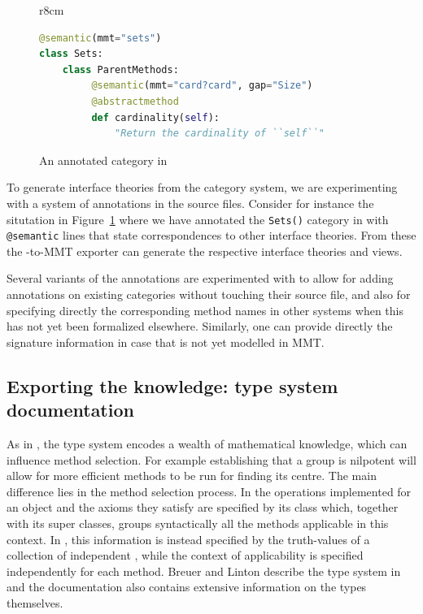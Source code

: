 \begin{figure}r{8cm}\vspace*{-2.5em}
\begin{lstlisting}[language=Python]
@semantic(mmt="sets")
class Sets:
    class ParentMethods:
         @semantic(mmt="card?card", gap="Size")
         @abstractmethod
         def cardinality(self):
             "Return the cardinality of ``self``"
\end{lstlisting}
\vspace*{-.5em}
\caption{An annotated category in \Sage}\label{fig:anncat}\vspace*{-1.5em}
\end{figure}
To generate interface theories from the \Sage category system, we are experimenting with a
system of annotations in the \Sage source files. Consider for instance the situtation in
Figure~\ref{fig:anncat} where we have annotated the \texttt{Sets()} category in \Sage
with \texttt{@semantic} lines that state correspondences to other interface theories. From
these the \Sage-to-MMT exporter can generate the respective interface theories and views.

Several variants of the annotations are experimented with to allow for adding annotations on existing
categories without touching their source file, and also for specifying directly the corresponding
method names in other systems when this has not yet been formalized elsewhere. Similarly,
one can provide directly the signature information in case that is not yet modelled in
MMT.


\subsection{Exporting the \GAP knowledge: type system documentation}
\label{sec:gaptypes}

As in \Sage, the \GAP type system encodes a wealth of mathematical
knowledge, which can influence method selection. For example
establishing that a group is nilpotent will allow for more efficient
methods to be run for finding its centre. The main difference lies in
the method selection process. In \Sage the operations
implemented for an object and the axioms they satisfy are specified by
its class which, together with its super classes, groups syntactically
all the methods applicable in this context. In \GAP, this information
is instead specified by the truth-values of a collection of
independent , while the context of applicability is
specified independently for each method.
%
Breuer and Linton describe the \GAP type system in \cite{breuer-linton} and
the \GAP documentation \cite{GAP4} also contains extensive information on the types
themselves.

